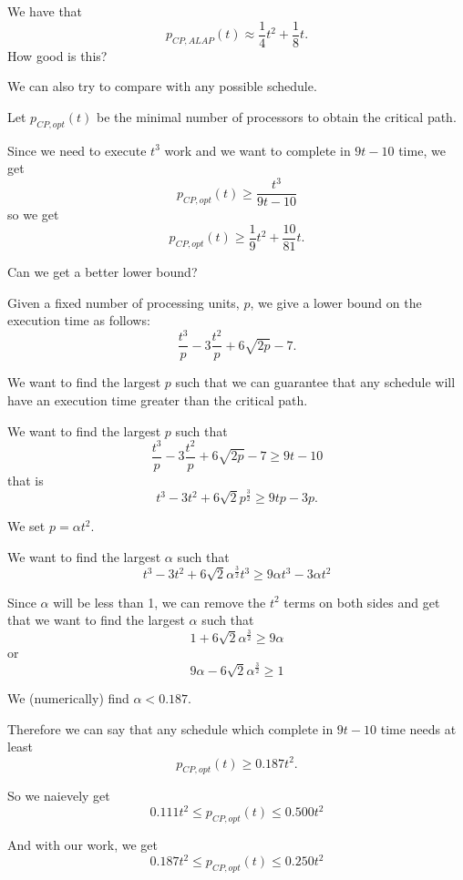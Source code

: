\begin{frame}

We have that
$$ p_{CP,ALAP}(t) \approx \frac{1}{4}t^2 +\frac{1}{8}t .$$
How good is this?

We can also try to compare with any possible schedule.

Let $p_{CP,opt}(t)$ be the minimal number of processors to obtain the critical path.

Since we need to execute $t^3$ work and we want to complete in $9t-10$ time, we get
$$ p_{CP,opt}(t) \geq \frac{t^3}{9t-10}$$
so we get
$$ p_{CP,opt}(t) \geq \frac{1}{9}t^2+\frac{10}{81}t.$$

Can we get a better lower bound?



\end{frame}




\begin{frame}
\scriptsize

Given a fixed number of 
processing units, $p$, we give a lower bound on the execution time as follows:
$$\frac{t^{3}}{p} - 3\frac{t^2}{p} + 6\sqrt{2p} - 7.$$

We want to find the largest $p$ such that we can guarantee that any schedule will have an execution time greater than the critical path.

We want to find the largest $p$ such that
$$\frac{t^{3}}{p} - 3\frac{t^2}{p} + 6\sqrt{2p} - 7 \geq 9t - 10 $$
that is
$$ t^{3} - 3t^2 + 6\sqrt{2}p^{\frac{3}{2}}  \geq 9tp - 3p. $$

We set $p=\alpha t^2$.

We want to find the largest $\alpha$ such that
$$ t^{3} - 3t^2 + 6\sqrt{2}\alpha^{\frac{3}{2}} t^3  \geq 9\alpha t^3 - 3\alpha t^2 $$

Since $\alpha$ will be less than 1, we can remove the $t^2$ terms on both sides and get
that 
we want to find the largest $\alpha$ such that
$$ 1 + 6\sqrt{2}\alpha^{\frac{3}{2}}   \geq 9\alpha  $$
or 
$$  9\alpha  - 6\sqrt{2}\alpha^{\frac{3}{2}}  \geq 1 $$

We (numerically) find $\alpha < 0.187$.

Therefore we can say that any schedule which complete in $9t-10$ time needs at least 
$$ p_{CP,opt}(t) \geq 0.187 t^2.$$



\end{frame}




\begin{frame}

So we naievely get
$$ 0.111 t^2 \leq p_{CP,opt}(t) \leq 0.500 t^2 $$

And with our work, we get
$$ 0.187 t^2 \leq p_{CP,opt}(t) \leq 0.250 t^2 $$

\end{frame}




